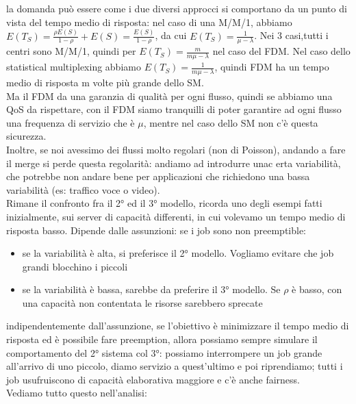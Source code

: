 \documentclass{article}
\begin{document}
la domanda può essere come i due diversi approcci si comportano da un punto di vista del tempo medio di risposta: nel caso di una M/M/1, abbiamo $E(T_S) = \frac{\rho E(S)}{1 - \rho} + E(S) = \frac{E(S)}{1 - \rho}$, da cui $E(T_S) = \frac{1}{\mu - \lambda}$. Nei 3 casi,tutti i centri sono M/M/1, quindi per $E(T_S) = \frac{m}{m \mu - \lambda}$ nel caso del FDM. Nel caso dello statistical multiplexing abbiamo $E(T_S) = \frac{1}{m \mu - \lambda}$, quindi FDM ha un tempo medio di risposta m volte più grande dello SM.\\ Ma il FDM da una garanzia di qualità per ogni flusso, quindi se abbiamo una QoS da rispettare, con il FDM siamo tranquilli di poter garantire ad ogni flusso una frequenza di servizio che è $\mu$, mentre nel caso dello SM non c'è questa sicurezza.\\ Inoltre, se noi avessimo dei flussi molto regolari (non di Poisson), andando a fare il merge si perde questa regolarità: andiamo ad introdurre unac erta variabilità, che potrebbe non andare bene per applicazioni che richiedono una bassa variabilità (es: traffico voce o video).\\ Rimane il confronto fra il 2° ed il 3° modello, ricorda uno degli esempi fatti inizialmente, sui server di capacità differenti, in cui volevamo un tempo medio di risposta basso. Dipende dalle assunzioni: se i job sono non preemptible:
\begin{itemize}
\item se la variabilità è alta, si preferisce il 2° modello. Vogliamo evitare che job grandi blocchino i piccoli
\item se la variabilità è bassa, sarebbe da preferire il 3° modello. Se $\rho$ è basso, con una capacità non contentata le risorse sarebbero sprecate
\end{itemize}
indipendentemente dall'assunzione, se l'obiettivo è minimizzare il tempo medio di risposta ed è possibile fare preemption, allora possiamo sempre simulare il comportamento del 2° sistema col 3°: possiamo interrompere un job grande all'arrivo di uno piccolo, diamo servizio a quest'ultimo e poi riprendiamo; tutti i job usufruiscono di capacità elaborativa maggiore e c'è anche fairness.\\ Vediamo tutto questo nell'analisi:
\end{document}
